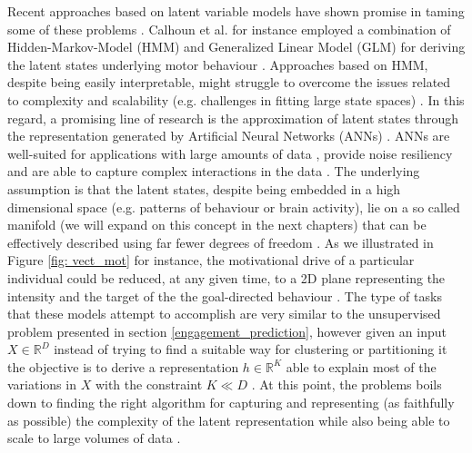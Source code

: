 Recent approaches based on latent variable models have shown promise in taming some of these problems \cite{calhoun2019unsupervised}. Calhoun et al. for instance employed a combination of Hidden-Markov-Model (HMM) and Generalized Linear Model (GLM) for deriving the latent states underlying motor behaviour \cite{calhoun2019unsupervised}. Approaches based on HMM, despite being easily interpretable, might struggle to overcome the issues related to complexity  \cite{eyjolfsdottir2016learning,schuster2007introduction} and scalability (e.g. challenges in fitting large state spaces) \cite{touloupou2020scalable}. In this regard, a promising line of research is the approximation of latent states through the representation generated by Artificial Neural Networks (ANNs) \cite{eyjolfsdottir2016learning,song2017reward,merel2019deep,luxem2020identifying, pereira2020quantifying, mccullough2021unsupervised, shi2021learning}. ANNs are well-suited for applications with large amounts of data \cite{oh2004gpu}, provide noise resiliency and are able to capture complex interactions in the data \cite{bengio2017deep}. The underlying assumption is that the latent states, despite being embedded in a high dimensional space (e.g. patterns of behaviour or brain activity), lie on a so called manifold (we will expand on this concept in the next chapters) that can be effectively described using far fewer degrees of freedom \cite{seung2000manifold, pang2016dimensionality, luxem2020identifying}. As we illustrated in Figure \ref{fig: vect_mot} for instance, the motivational drive of a particular individual could be reduced, at any given time, to a 2D plane representing the intensity and the target of the the goal-directed behaviour \cite{simpson2016behavioral}. The type of tasks that these models attempt to accomplish are very similar to the unsupervised problem presented in section \ref{engagement_prediction}, however given an input $X \in \mathbb{R}^{D}$ instead of trying to find a suitable way for clustering or partitioning it the objective is to derive a representation $h \in \mathbb{R}^{K}$ able to explain most of the variations in $X$ with the constraint $K \ll D$ \cite{bishop2006pattern,murphy2022probabilistic}. At this point, the problems boils down to finding the right algorithm for capturing and representing (as faithfully as possible) the complexity of the latent representation \cite{eyjolfsdottir2016learning,schuster2007introduction} while also being able to scale to large volumes of data \cite{touloupou2020scalable}. 

